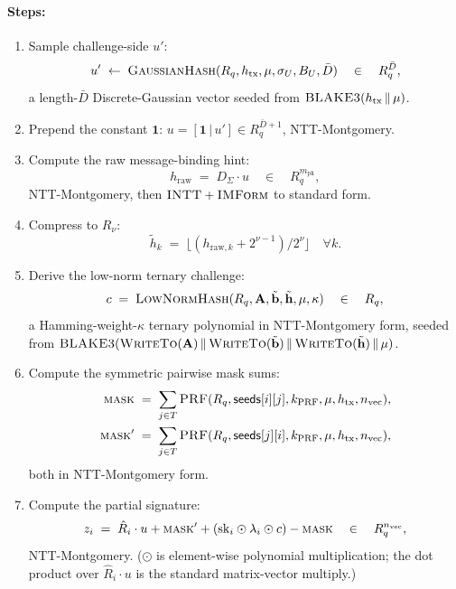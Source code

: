 \paragraph{Steps:}
\begin{enumerate}[leftmargin=2em, nosep]
\item Sample challenge-side $u'$:
      \[
        u' \;\leftarrow\; \textsc{GaussianHash}(R_q, h_{\mathrm{tx}},
        \mu, \sigma_U, B_U, \bar D)
        \quad \in \quad R_q^{\bar D},
      \]
      a length-$\bar D$ Discrete-Gaussian vector seeded from
      $\textsc{BLAKE3}(h_{\mathrm{tx}} \,\|\, \mu)$.
\item Prepend the constant $\mathbf{1}$:
      $u = [\mathbf{1} \,|\, u'] \in R_q^{\bar D + 1}$, NTT-Montgomery.
\item Compute the raw message-binding hint:
      \[
        h_{\mathrm{raw}} \;=\; D_\Sigma \cdot u
        \quad \in \quad R_q^{m_{\mathrm{pk}}},
      \]
      NTT-Montgomery, then $\textsc{INTT} + \textsc{IMForm}$ to
      standard form.
\item Compress to $R_\nu$:
      \[
        \tilde h_k \;=\; \bigl\lfloor (h_{\mathrm{raw},k} +
        2^{\nu-1}) / 2^{\nu} \bigr\rfloor
        \quad \forall k.
      \]
\item Derive the low-norm ternary challenge:
      \[
        c \;=\; \textsc{LowNormHash}(R_q, \mathbf{A}, \tilde{\mathbf{b}},
        \tilde{\mathbf{h}}, \mu, \kappa)
        \quad \in \quad R_q,
      \]
      a Hamming-weight-$\kappa$ ternary polynomial in NTT-Montgomery
      form, seeded from $\textsc{BLAKE3}(\textsc{WriteTo}(\mathbf{A})
      \,\|\, \textsc{WriteTo}(\tilde{\mathbf{b}}) \,\|\,
      \textsc{WriteTo}(\tilde{\mathbf{h}}) \,\|\, \mu)$.
\item Compute the symmetric pairwise mask sums:
      \begin{align*}
        \textsc{mask}
        \;&=\; \sum_{j \in T} \textsc{PRF}(R_q, \mathsf{seeds}[i][j],
                k_{\mathrm{PRF}}, \mu, h_{\mathrm{tx}},
                n_{\mathrm{vec}}), \\
        \textsc{mask}'
        \;&=\; \sum_{j \in T} \textsc{PRF}(R_q, \mathsf{seeds}[j][i],
                k_{\mathrm{PRF}}, \mu, h_{\mathrm{tx}},
                n_{\mathrm{vec}}),
      \end{align*}
      both in NTT-Montgomery form.
\item Compute the partial signature:
      \[
        z_i \;=\; \hat R_i \cdot u
        + \textsc{mask}'
        + (\mathrm{sk}_i \odot \lambda_i \odot c)
        - \textsc{mask}
        \quad \in \quad R_q^{n_{\mathrm{vec}}},
      \]
      NTT-Montgomery. ($\odot$ is element-wise polynomial multiplication;
      the dot product over $\hat R_i \cdot u$ is the standard
      matrix-vector multiply.)
\end{enumerate}

